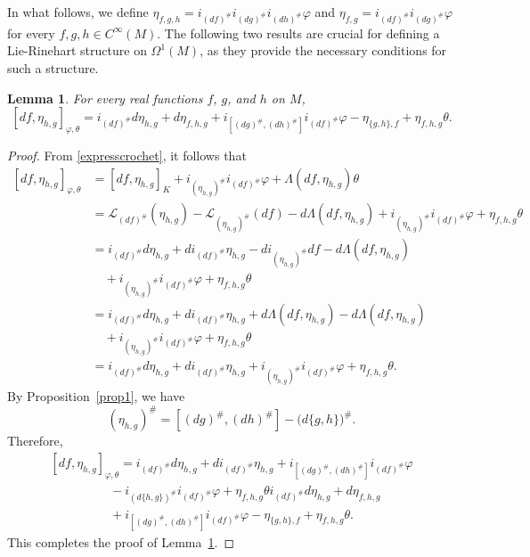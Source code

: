 \documentclass[a4paper,10pt]{article}
\numberwithin{equation}{section}
\theoremstyle{plain}
\newtheorem{lemma}[theorem]{Lemma}
\begin{document}
			In what follows, we define $\eta_{f,g,h}=i_{(df)^{\#}}i_{(dg)^{\#}}i_{(dh)^{\#}}\varphi$ and $\eta_{f,g}=i_{(df)^{\#}}i_{(dg)^{\#}}\varphi$ for every $f, g, h \in C^\infty(M)$. The following two results are crucial for defining a Lie-Rinehart structure on $\Omega^1(M)$, as they provide the necessary conditions for such a structure.
		\begin{lemma}\label{lemm1} For every real functions $f$, $g$, and $h$ on $M$,
			$$[df,\eta_{h,g}]_{\varphi,\theta}=i_{(df)^{\#}}d\eta_{h,g}+d\eta_{f,h,g}+ i_{[(dg)^{\#},(dh)^{\#}]}i_{(df)^{\#}}\varphi-\eta_{\{g,h\},f}+\eta_{f,h,g}\theta.$$
		\end{lemma}
		\begin{proof}	
			From \eqref{expresscrochet}, it follows that
			\begin{align*}
				[df,\eta_{h,g}]_{\varphi,\theta} &=[df,\eta_{h,g}]_K+i_{(\eta_{h,g})^{\#}}i_{(df)^{\#}}\varphi +\Lambda(df,\eta_{h,g})\theta\\
				&=\mathcal{L}_{(df)^{\#}}(\eta_{h,g})-\mathcal{L}_{(\eta_{h,g})^{\#}}(df)-d\Lambda(df,\eta_{h,g})
				+i_{(\eta_{h,g})^{\#}}i_{(df)^{\#}}\varphi +\eta_{f,h,g}\theta\\
				&=i_{(df)^{\#}}d\eta_{h,g}+di_{(df)^{\#}}\eta_{h,g}-di_{(\eta_{h,g})^{\#}}df-d\Lambda(df,\eta_{h,g})\\
				&\quad+i_{(\eta_{h,g})^{\#}}i_{(df)^{\#}}\varphi+\eta_{f,h,g}\theta\\
				&=i_{(df)^{\#}}d\eta_{h,g}+di_{(df)^{\#}}\eta_{h,g}+d\Lambda(df,\eta_{h,g})-d\Lambda(df,\eta_{h,g})\\
				&\quad+i_{(\eta_{h,g})^{\#}}i_{(df)^{\#}}\varphi+\eta_{f,h,g}\theta\\
				&=i_{(df)^{\#}}d\eta_{h,g}+di_{(df)^{\#}}\eta_{h,g}+i_{(\eta_{h,g})^{\#}}i_{(df)^{\#}}\varphi+\eta_{f,h,g}\theta.
			\end{align*}
			By Proposition~\ref{prop1}, we have $$(\eta_{h,g})^{\#}=[(dg)^{\#},(dh)^{\#}]-\big(d\{g,h\}\big)^{\#}.$$
			Therefore,
			\begin{equation}\label{sr3}
				\begin{array}{l}
					[df,\eta_{h,g}]_{\varphi,\theta}= i_{(df)^{\#}}d\eta_{h,g}+di_{(df)^{\#}}\eta_{h,g}+i_{[(dg)^{\#},(dh)^{\#}]}i_{(df)^{\#}}\varphi
					\\\hspace{2cm}-i_{(d\{h,g\})^{\#}}i_{(df)^{\#}}\varphi+\eta_{f,h,g}\theta
					i_{(df)^{\#}}d\eta_{h,g}+d\eta_{f,h,g}\\\hspace{2cm}+ i_{[(dg)^{\#},(dh)^{\#}]}i_{(df)^{\#}}\varphi-\eta_{\{g,h\},f}+\eta_{f,h,g}\theta.
				\end{array}
			\end{equation}	
			This completes the proof of Lemma~\ref{lemm1}.
			
		\end{proof}\par
\end{document}

